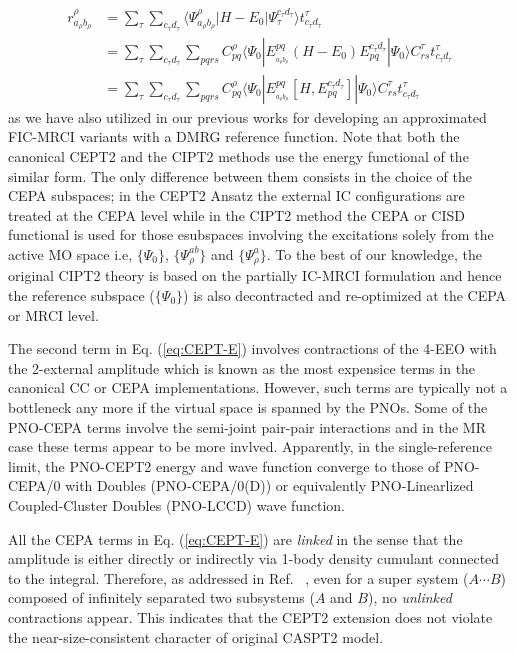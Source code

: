 \documentclass[aip,jcp,amsmath]{revtex4-1}
\begin{document}
%
\begin{align}
  r_{a_\rho b_\rho}^{\rho} &= \sum_{\tau}\sum_{c_\tau d_\tau}\langle\Psi_{a_\rho b_\rho}^{\rho}|H-E_0|\Psi_{\tau}^{c_\tau d_\tau}\rangle t_{c_\tau d_\tau}^\tau \nonumber \\
  &= \sum_{\tau}\sum_{c_\tau d_\tau} \sum_{pqrs} C_{pq}^\rho \langle\Psi_0|E_{_{a_\rho b_\rho}}^{pq}(H-E_0)E_{pq}^{c_\tau d_\tau}|\Psi_0\rangle C_{rs}^\tau t_{c_\tau d_\tau}^\tau \nonumber \\
  &= \sum_{\tau}\sum_{c_\tau d_\tau} \sum_{pqrs} C_{pq}^\rho \langle\Psi_0|E_{_{a_\rho b_\rho}}^{pq}[H,E_{pq}^{c_\tau d_\tau}]|\Psi_0\rangle C_{rs}^\tau t_{c_\tau d_\tau}^\tau \label{eq:comm}
\end{align}
as we have also utilized in our previous works for developing an approximated FIC-MRCI variants with a DMRG reference function.\cite{saitowmultireference2013,doi:10.1021/acs.jctc.5b00270}
%
Note that both the canonical CEPT2 and the CIPT2\cite{celanithe2004} methods use the energy functional of the similar form.
%
The only difference between them consists in the choice of the CEPA subspaces; in the CEPT2 Ansatz the external IC configurations are treated at the CEPA level while in the CIPT2 method the CEPA or CISD functional is used for those esubspaces involving the excitations solely from the active MO space i.e, $\{\Psi_0\}$, $\{\Psi_\rho^{ab}\}$ and $\{\Psi_\rho^a\}$.
%
To the best of our knowledge, the original CIPT2 theory is based on the partially IC-MRCI formulation and hence the reference subspace ($\{\Psi_0\}$) is also decontracted and re-optimized at the CEPA or MRCI level.

%
The second term in Eq. (\ref{eq:CEPT-E}) involves contractions of the 4-EEO with the 2-external amplitude which is known as the most expensice terms in the canonical CC or CEPA implementations.
%
However, such terms are typically not a bottleneck any more if the virtual space is spanned by the PNOs.
%
Some of the PNO-CEPA terms involve the semi-joint pair-pair interactions and in the MR case these terms appear to be more invlved.
%
Apparently, in the single-reference limit, the PNO-CEPT2 energy and wave function converge to those of PNO-CEPA/0 with Doubles (PNO-CEPA/0(D)) or equivalently PNO-Linearlized Coupled-Cluster Doubles (PNO-LCCD) wave function.

%
All the CEPA terms in Eq. (\ref{eq:CEPT-E}) are {\it linked} in the sense that the amplitude is either directly or indirectly via 1-body density cumulant connected to the integral.
%
Therefore, as addressed in Ref. ~, even for a super system ($A\cdots B$) composed of infinitely separated two subsystems ($A$ and $B$), no {\it unlinked} contractions appear.
%
This indicates that the CEPT2 extension does not violate the near-size-consistent character of original CASPT2 model.
\end{document}
